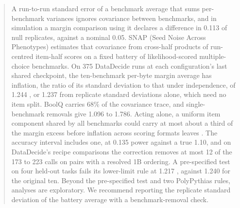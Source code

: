 \begin{abstract}
A run-to-run standard error of a benchmark average that sums per-benchmark variances ignores covariance between benchmarks, and in simulation a margin comparison using it declares a difference in 0.113 of null replicates, against a nominal 0.05. SNAP (Seed Noise Across Phenotypes) estimates that covariance from cross-half products of run-centred item-half scores on a fixed battery of likelihood-scored multiple-choice benchmarks. On 375 DataDecide runs at each configuration's last shared checkpoint, the ten-benchmark per-byte margin average has inflation, the ratio of its standard deviation to that under independence, of 1.244 , or 1.237  from replicate standard deviations alone, which need no item split. BoolQ carries 68\% of the covariance trace, and single-benchmark removals give 1.096 to 1.786. Acting alone, a uniform item component shared by all benchmarks could carry at most about a third of the margin excess before inflation across scoring formats leaves . The accuracy interval  includes one, at 0.135 power against a true 1.10, and on DataDecide's recipe comparisons the correction removes at most 12 of the 173 to 223 calls on pairs with a resolved 1B ordering. A pre-specified test on four held-out tasks fails its lower-limit rule at 1.217 , against 1.240  for the original ten.  Beyond the pre-specified test and two PolyPythias rules, analyses are exploratory. We recommend reporting the replicate standard deviation of the battery average with a benchmark-removal check.
\end{abstract}

